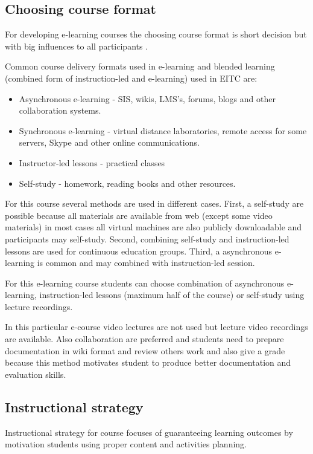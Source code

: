 \subsection{Choosing course format}

For developing e-learning courses the choosing course format is short decision but with big influences to all participants \citep[p.14]{OppeArenduskeskus2010}. 

Common course delivery formats used in e-learning and blended learning (combined form of instruction-led and e-learning) used in \gls{EITC} are: 
\begin{itemize}
\item Asynchronous e-learning - \gls{SIS}, wikis, \gls{LMS}'s, forums, blogs and other collaboration systems.
\item Synchronous e-learning - virtual distance laboratories, remote access for some servers, Skype and other online communications.
\item Instructor-led lessons - practical classes
\item Self-study - homework, reading books and other resources.
\end{itemize}

For this course several methods are used in different cases. First, a self-study are possible because all materials are available from web (except some video materials) in most cases all virtual machines are also publicly downloadable and participants may self-study. Second, combining self-study and instruction-led lessons are used for continuous education groups. Third, a asynchronous e-learning is common and may combined with instruction-led session.

For this e-learning course students can choose combination of asynchronous e-learning, instruction-led lessons (maximum half of the course) or self-study using lecture recordings.

In this particular e-course video lectures are not used but lecture video recordings are available. Also collaboration are preferred and students need to prepare documentation in wiki format and review others work and also give a grade because this method motivates student to produce better documentation and evaluation skills.




\subsection{Instructional strategy}
Instructional strategy for course focuses of guaranteeing learning outcomes by motivation students using proper content and activities planning.


